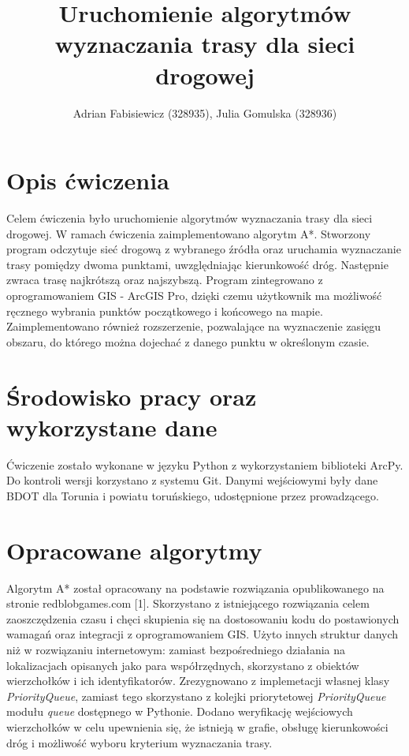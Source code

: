 \documentclass{article}
\title{Uruchomienie algorytmów wyznaczania trasy dla sieci drogowej}
\author{Adrian Fabisiewicz (328935), Julia Gomulska (328936)}
\begin{document}
\maketitle
\renewcommand{\labelenumii}{\arabic{enumi}.\arabic{enumii}}
\renewcommand{\labelenumiii}{\arabic{enumi}.\arabic{enumii}.\arabic{enumiii}}
\renewcommand{\labelenumiv}{\arabic{enumi}.\arabic{enumii}.\arabic{enumiii}.\arabic{enumiv}}

\section{Opis ćwiczenia}

Celem ćwiczenia było uruchomienie algorytmów wyznaczania trasy dla sieci drogowej. W ramach ćwiczenia zaimplementowano algorytm A*. Stworzony program odczytuje sieć drogową z wybranego źródła oraz uruchamia wyznaczanie trasy pomiędzy dwoma punktami, uwzględniając kierunkowość dróg. Następnie zwraca trasę najkrótszą oraz najszybszą. Program zintegrowano z oprogramowaniem GIS - ArcGIS Pro, dzięki czemu użytkownik ma możliwość ręcznego wybrania punktów początkowego i końcowego na mapie. Zaimplementowano również rozszerzenie, pozwalające na wyznaczenie zasięgu obszaru, do którego można dojechać z danego punktu w określonym czasie.

\section{Środowisko pracy oraz wykorzystane dane}
Ćwiczenie zostało wykonane w języku Python z wykorzystaniem biblioteki ArcPy. Do kontroli wersji korzystano z systemu Git. Danymi wejściowymi były dane BDOT dla Torunia i powiatu toruńskiego, udostępnione przez prowadzącego.

\section{Opracowane algorytmy}
Algorytm A* został opracowany na podstawie rozwiązania opublikowanego na stronie redblobgames.com [1].
Skorzystano z istniejącego rozwiązania celem zaoszczędzenia czasu i chęci skupienia się na dostosowaniu kodu do postawionych wamagań oraz integracji z oprogramowaniem GIS.
Użyto innych struktur danych niż w rozwiązaniu internetowym: zamiast bezpośredniego działania na lokalizacjach opisanych jako para współrzędnych, skorzystano z obiektów wierzchołków i ich identyfikatorów.
Zrezygnowano z implemetacji własnej klasy \textit{PriorityQueue}, zamiast tego skorzystano z kolejki priorytetowej \textit{PriorityQueue} modułu \textit{queue} dostępnego w Pythonie.
Dodano weryfikację wejściowych wierzchołków w celu upewnienia się, że istnieją w grafie, obsługę kierunkowości dróg i możliwość wyboru kryterium wyznaczania trasy. 
\end{document}
